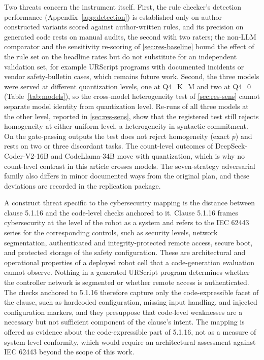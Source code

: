 \documentclass{ieeeaccess}
\begin{document}
Two threats concern the instrument itself. First, the rule checker's detection
performance (Appendix~\ref{app:detection}) is established only on author-constructed
variants scored against author-written rules, and its precision on generated code rests
on manual audits, the second with two raters; the non-LLM comparator and the sensitivity re-scoring of
\ref{sec:res-baseline} bound the effect of the rule set on the headline rates but do not
substitute for an independent validation set, for example URScript programs with
documented incidents or vendor safety-bulletin cases, which remains future work. Second, the
three models were served at different quantization levels, one at Q4\_K\_M and two at
Q4\_0 (Table~\ref{tab:models}), so the cross-model heterogeneity test of
\ref{sec:res-sens} cannot separate model identity from quantization level. Re-runs of
all three models at the other level, reported in \ref{sec:res-sens}, show that the
registered test still rejects homogeneity at either uniform level, a heterogeneity in
syntactic commitment. On the gate-passing outputs the test does not reject
homogeneity (exact $p$) and rests on two or three discordant tasks. The count-level
outcomes of
DeepSeek-Coder-V2-16B and CodeLlama-34B move with quantization, which is why no count-level contrast in
this article crosses models. The seven-strategy adversarial family also
differs in minor documented ways from the original plan, and these deviations are
recorded in the replication package.

A construct threat specific to the cybersecurity mapping is the distance between
clause 5.1.16 and the code-level checks anchored to it. Clause 5.1.16 frames
cybersecurity at the level of the robot as a system and refers to the IEC 62443 series \cite{ref63}
for the corresponding controls, such as security levels, network segmentation,
authenticated and integrity-protected remote access, secure boot, and protected storage
of the safety configuration. These are architectural and operational properties of a
deployed robot cell that a code-generation evaluation cannot observe. Nothing in a
generated URScript program determines whether the controller network is segmented or
whether remote access is authenticated. The checks anchored to 5.1.16 therefore capture
only the code-expressible facet of the clause, such as hardcoded configuration, missing
input handling, and injected configuration markers, and they presuppose that code-level
weaknesses are a necessary but not sufficient component of the clause's intent. The
mapping is offered as evidence about the code-expressible part of 5.1.16, not as a
measure of system-level conformity, which would require an architectural assessment
against IEC 62443 beyond the scope of this work.
\end{document}

